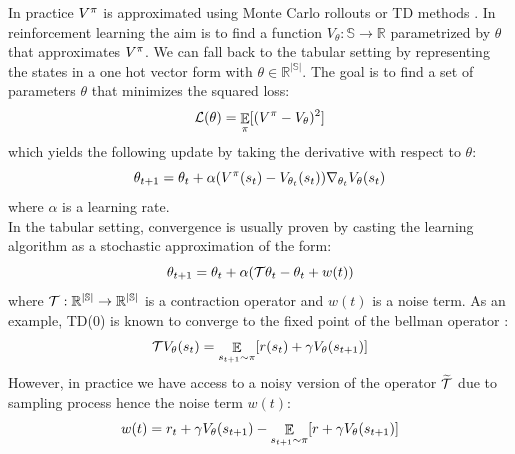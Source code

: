 In practice $V^{\pi}$ is approximated using Monte Carlo rollouts \cite{suttonreinforcement} or TD methods \cite{sutton1988learning}. In reinforcement learning the aim is to find a function $V_\theta: \mathbb{S} \rightarrow \mathbb{R}$ parametrized by $\theta$ that approximates $V^{\pi}$. We can fall back to the tabular setting by representing the states in a one hot vector form with $\theta \in \mathbb{R^{|\mathbb{S}|}}$. The goal is to find a set of parameters $\theta$ that minimizes the squared loss:
\begin{equation}\label{simple_loss}
    \mathcal{L}(\theta) = \mathop{\mathbb{E}}_{\pi} [(V^{\pi} - V_\theta)^2]
\end{equation}
which yields the following update by taking the derivative with respect to $\theta$:
\begin{equation}
    \theta_{t+1} = \theta_t + \alpha (V^{\pi}(s_t) - V_{\theta_t}(s_t)) \nabla_{\theta_t} V_{\theta}(s_t)
\end{equation}
where $\alpha$ is a learning rate.\\
In the tabular setting, convergence is usually proven by casting the learning algorithm as a stochastic approximation \cite{tsitsiklis1994asynchronous,borkar2009stochastic,borkar2000ode} of the form:
\begin{equation}\label{stoch}
    \theta_{t+1} = \theta_t + \alpha( \mathcal{T} \theta_t  - \theta_t + w(t)) 
\end{equation}
where $\mathcal{T}: \mathbb{R^{|\mathbb{S}|}} \rightarrow \mathbb{R^{|\mathbb{S}|}}$ is a contraction operator and $w(t)$ is a noise term. 
As an example, TD(0) is known to converge to the fixed point of the bellman operator \cite{sutton1988learning}:
\begin{equation}
\begin{split}
    \mathcal{T} V_{\theta}(s_t) &= \mathop{\mathbb{E}}_{s_{t+1} \sim \pi} [r(s_t) + \gamma V_{\theta}(s_{t+1})]\\
\end{split}
\end{equation}
However, in practice we have access to a noisy version of the operator $\widetilde{\mathcal{T}}$ due to sampling process hence the noise term $w(t)$:
\begin{equation}
    w(t) = r_t + \gamma V_{\theta} (s_{t+1}) - \mathop{\mathbb{E}}_{s_{t+1} \sim \pi} [r + \gamma V_{\theta}(s_{t+1})]
\end{equation}




